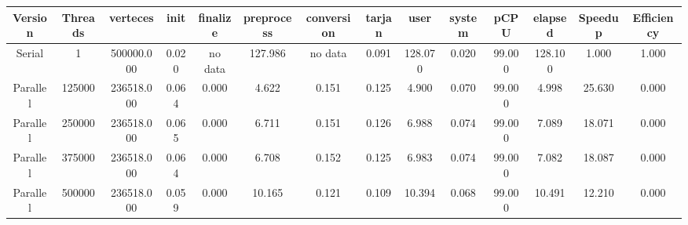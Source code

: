 \begin{tabular}{|c|c|c|c|c|c|c|c|c|c|c|c|c|c|}
\toprule
 Version &  Threads &   verteces &  init & finalize &  preprocess & conversion &  tarjan &    user &  system &   pCPU &  elapsed &  Speedup &  Efficiency \\
\midrule
  Serial &        1 & 500000.000 & 0.020 &  no data &     127.986 &    no data &   0.091 & 128.070 &   0.020 & 99.000 &  128.100 &    1.000 &       1.000 \\
Parallel &   125000 & 236518.000 & 0.064 &    0.000 &       4.622 &      0.151 &   0.125 &   4.900 &   0.070 & 99.000 &    4.998 &   25.630 &       0.000 \\
Parallel &   250000 & 236518.000 & 0.065 &    0.000 &       6.711 &      0.151 &   0.126 &   6.988 &   0.074 & 99.000 &    7.089 &   18.071 &       0.000 \\
Parallel &   375000 & 236518.000 & 0.064 &    0.000 &       6.708 &      0.152 &   0.125 &   6.983 &   0.074 & 99.000 &    7.082 &   18.087 &       0.000 \\
Parallel &   500000 & 236518.000 & 0.059 &    0.000 &      10.165 &      0.121 &   0.109 &  10.394 &   0.068 & 99.000 &   10.491 &   12.210 &       0.000 \\
\bottomrule
\end{tabular}
